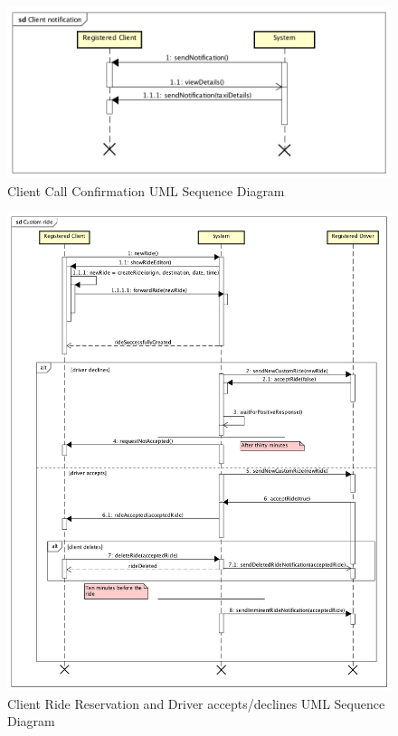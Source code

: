 \documentclass[a4paper]{article}
\begin{document}
\begin{figure}[H]
\includegraphics[width=\sequenceWidth]{Sequence-Client-Notification}
\centering
\caption{Client Call Confirmation UML Sequence Diagram}
\label{fig:sequenceclientnotification}
\end{figure}

\begin{figure}[H]
\includegraphics[width=\sequenceWidth]{Sequence-Client-RideReservation}
\centering
\caption{Client Ride Reservation and Driver accepts/declines UML Sequence Diagram}
\label{fig:sequenceclientridereservation}
\end{figure}
\end{document}
